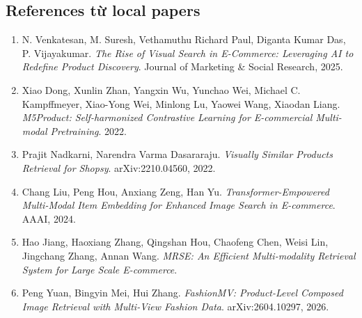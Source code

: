 \documentclass[12pt,a4paper]{article}
\begin{document}
\subsection{References từ local papers}
\begin{enumerate}
  \item N. Venkatesan, M. Suresh, Vethamuthu Richard Paul, Diganta Kumar Das, P. Vijayakumar. \emph{The Rise of Visual Search in E-Commerce: Leveraging AI to Redefine Product Discovery}. Journal of Marketing \& Social Research, 2025.
  \item Xiao Dong, Xunlin Zhan, Yangxin Wu, Yunchao Wei, Michael C. Kampffmeyer, Xiao-Yong Wei, Minlong Lu, Yaowei Wang, Xiaodan Liang. \emph{M5Product: Self-harmonized Contrastive Learning for E-commercial Multi-modal Pretraining}. 2022.
  \item Prajit Nadkarni, Narendra Varma Dasararaju. \emph{Visually Similar Products Retrieval for Shopsy}. arXiv:2210.04560, 2022.
  \item Chang Liu, Peng Hou, Anxiang Zeng, Han Yu. \emph{Transformer-Empowered Multi-Modal Item Embedding for Enhanced Image Search in E-commerce}. AAAI, 2024.
  \item Hao Jiang, Haoxiang Zhang, Qingshan Hou, Chaofeng Chen, Weisi Lin, Jingchang Zhang, Annan Wang. \emph{MRSE: An Efficient Multi-modality Retrieval System for Large Scale E-commerce}.
  \item Peng Yuan, Bingyin Mei, Hui Zhang. \emph{FashionMV: Product-Level Composed Image Retrieval with Multi-View Fashion Data}. arXiv:2604.10297, 2026.
\end{enumerate}
\end{document}
